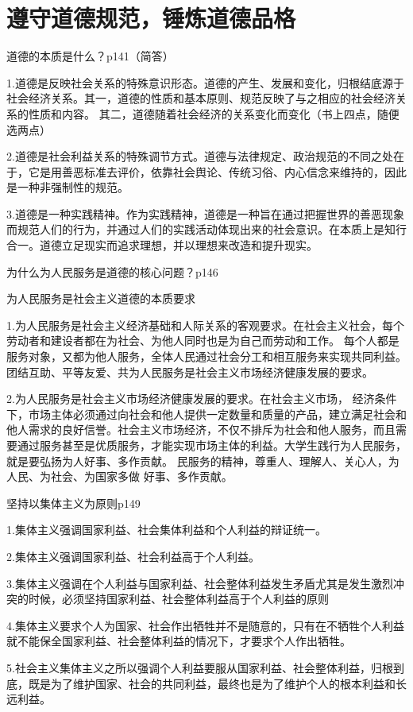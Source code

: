 \documentclass[lang=cn,10pt]{elegantbook}
\begin{document}
	\chapter{遵守道德规范，锤炼道德品格}
	\begin{example}
		道德的本质是什么？p141（简答）
	\end{example}
	\begin{solution}
		
		1.道德是反映社会关系的特殊意识形态。道德的产生、发展和变化，归根结底源于社会经济关系。其一，道德的性质和基本原则、规范反映了与之相应的社会经济关系的性质和内容。
		其二，道德随着社会经济的关系变化而变化（书上四点，随便选两点）
		
		2.道德是社会利益关系的特殊调节方式。道德与法律规定、政治规范的不同之处在于，它是用善恶标准去评价，依靠社会舆论、传统习俗、内心信念来维持的，因此是一种非强制性的规范。
		
		3.道德是一种实践精神。作为实践精神，道德是一种旨在通过把握世界的善恶现象而规范人们的行为，并通过人们的实践活动体现出来的社会意识。在本质上是知行合一。道德立足现实而追求理想，并以理想来改造和提升现实。
	\end{solution}
	\begin{example}
		为什么为人民服务是道德的核心问题？p146
	\end{example}
	\begin{solution}
		为人民服务是社会主义道德的本质要求
		
		1.为人民服务是社会主义经济基础和人际关系的客观要求。在社会主义社会，每个劳动者和建设者都在为社会、为他人同时也是为自己而劳动和工作。 每个人都是服务对象，又都为他人服务，全体人民通过社会分工和相互服务来实现共同利益。团结互助、平等友爱、共为人民服务是社会主义市场经济健康发展的要求。
		
		
		2.为人民服务是社会主义市场经济健康发展的要求。在社会主义市场，
		经济条件下，市场主体必须通过向社会和他人提供一定数量和质量的产品，建立满足社会和他人需求的良好信誉。社会主义市场经济，不仅不排斥为社会和他人服务，而且需要通过服务甚至是优质服务，才能实现市场主体的利益。大学生践行为人民服务，就是要弘扬为人好事、多作贡献。
		民服务的精神，尊重人、理解人、关心人，为人民、为社会、为国家多做
		好事、多作贡献。
	\end{solution}
	\begin{example}
		坚持以集体主义为原则p149
	\end{example}
	\begin{solution}
		
		1.集体主义强调国家利益、社会集体利益和个人利益的辩证统一。
		
		2.集体主义强调国家利益、社会利益高于个人利益。
		
		3.集体主义强调在个人利益与国家利益、社会整体利益发生矛盾尤其是发生激烈冲突的时候，必须坚持国家利益、社会整体利益高于个人利益的原则
		
		4.集体主义要求个人为国家、社会作出牺牲并不是随意的，只有在不牺牲个人利益就不能保全国家利益、社会整体利益的情况下，才要求个人作出牺牲。
		
		5.社会主义集体主义之所以强调个人利益要服从国家利益、社会整体利益，归根到底，既是为了维护国家、社会的共同利益，最终也是为了维护个人的根本利益和长远利益。
	\end{solution}
\end{document}

